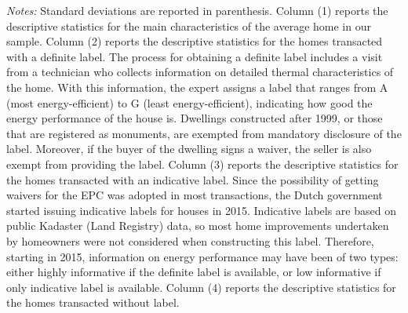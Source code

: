 \documentclass[12pt]{article}
\begin{document}
\begin{table}[H]
\begin{tabular}{lcccc}
    \end{tabular}%
\begin{tablenotes}
\scriptsize
\item \textit{Notes:} Standard deviations are reported in parenthesis. Column (1) reports the descriptive statistics for the main characteristics of the average home in our sample. Column (2) reports the descriptive statistics for the homes transacted with a definite label. The process for obtaining a definite label includes a visit from a technician who collects information on detailed thermal characteristics of the home. With this information, the expert assigns a label that ranges from A (most energy-efficient) to G (least energy-efficient), indicating how good the energy performance of the house is. Dwellings constructed after 1999, or those that are registered as monuments, are exempted from mandatory disclosure of the label. Moreover, if the buyer of the dwelling signs a waiver, the seller is also exempt from providing the label. Column (3) reports the descriptive statistics for the homes transacted with an indicative label. Since the possibility of getting waivers for the EPC was adopted in most transactions, the Dutch government started issuing indicative labels for houses in 2015. Indicative labels are based on public Kadaster (Land Registry) data, so most home improvements undertaken by homeowners were not considered when constructing this label. Therefore, starting in 2015, information on energy performance may have been of two types: either highly informative if the definite label is available, or low informative if only indicative label is available. Column (4) reports the descriptive statistics for the homes transacted without label.
\end{tablenotes}

  \label{tab:addlabel}%
\end{table}%
\end{document}
